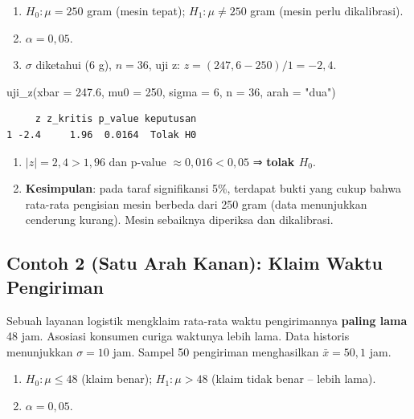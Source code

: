 \documentclass[
  indonesian,
  letterpaper,
]{book}
\newenvironment{Shaded}{\begin{snugshade}}{\end{snugshade}}
\newcommand{\AttributeTok}[1]{\textcolor[rgb]{0.40,0.45,0.13}{#1}}
\newcommand{\DecValTok}[1]{\textcolor[rgb]{0.68,0.00,0.00}{#1}}
\newcommand{\FloatTok}[1]{\textcolor[rgb]{0.68,0.00,0.00}{#1}}
\newcommand{\FunctionTok}[1]{\textcolor[rgb]{0.28,0.35,0.67}{#1}}
\newcommand{\NormalTok}[1]{\textcolor[rgb]{0.00,0.23,0.31}{#1}}
\newcommand{\StringTok}[1]{\textcolor[rgb]{0.13,0.47,0.30}{#1}}
\providecommand{\tightlist}{%
  \setlength{\itemsep}{0pt}\setlength{\parskip}{0pt}}
\begin{document}
\begin{enumerate}
\def\labelenumi{\arabic{enumi}.}
\tightlist
\item
  \(H_0: \mu = 250\) gram (mesin tepat); \(H_1: \mu \ne 250\) gram
  (mesin perlu dikalibrasi).
\item
  \(\alpha = 0{,}05\).
\item
  \(\sigma\) diketahui (6 g), \(n = 36\), uji z:
  \(z = (247{,}6 - 250)/1 = -2{,}4\).
\end{enumerate}

\begin{Shaded}
\begin{Highlighting}[]
\FunctionTok{uji\_z}\NormalTok{(}\AttributeTok{xbar =} \FloatTok{247.6}\NormalTok{, }\AttributeTok{mu0 =} \DecValTok{250}\NormalTok{, }\AttributeTok{sigma =} \DecValTok{6}\NormalTok{, }\AttributeTok{n =} \DecValTok{36}\NormalTok{, }\AttributeTok{arah =} \StringTok{"dua"}\NormalTok{)}
\end{Highlighting}
\end{Shaded}

\begin{verbatim}
     z z_kritis p_value keputusan
1 -2.4     1.96  0.0164  Tolak H0
\end{verbatim}

\begin{enumerate}
\def\labelenumi{\arabic{enumi}.}
\setcounter{enumi}{3}
\tightlist
\item
  \(\lvert z \rvert = 2{,}4 > 1{,}96\) dan p-value
  \(\approx 0{,}016 < 0{,}05\) ⇒ \textbf{tolak \(H_0\)}.
\item
  \textbf{Kesimpulan}: pada taraf signifikansi 5\%, terdapat bukti yang
  cukup bahwa rata-rata pengisian mesin berbeda dari 250 gram (data
  menunjukkan cenderung kurang). Mesin sebaiknya diperiksa dan
  dikalibrasi.
\end{enumerate}

\subsection{Contoh 2 (Satu Arah Kanan): Klaim Waktu
Pengiriman}\label{contoh-2-satu-arah-kanan-klaim-waktu-pengiriman}

Sebuah layanan logistik mengklaim rata-rata waktu pengirimannya
\textbf{paling lama} 48 jam. Asosiasi konsumen curiga waktunya lebih
lama. Data historis menunjukkan \(\sigma = 10\) jam. Sampel 50
pengiriman menghasilkan \(\bar{x} = 50{,}1\) jam.

\begin{enumerate}
\def\labelenumi{\arabic{enumi}.}
\tightlist
\item
  \(H_0: \mu \le 48\) (klaim benar); \(H_1: \mu > 48\) (klaim tidak
  benar -- lebih lama).
\item
  \(\alpha = 0{,}05\).
\end{enumerate}
\end{document}
